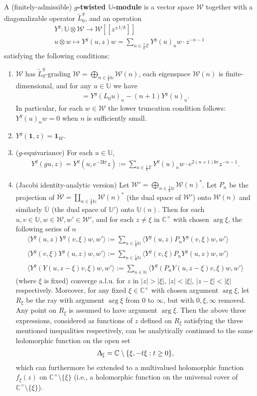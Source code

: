 \documentclass[12pt,a4paper,notitlepage]{article}
\theoremstyle{definition}
\theoremstyle{plain}
\newcommand{\mc}{\mathcal}
\newcommand{\wtd}{\widetilde}
\newcommand{\ovl}{\overline}
\newcommand{\id}{\mathbf{1}}
\newcommand{\bk}[1]{\langle {#1}\rangle}
\newcommand{\im}{\mathbf{i}}
\newcommand{\Ubb}{\mathbb U}
\newcommand{\Cbb}{\mathbb C}
\newcommand{\Nbb}{\mathbb N}
\newcommand{\Zbb}{\mathbb Z}
\numberwithin{equation}{section}
\begin{document}
A (finitely-admissible)  \textbf{$g$-twisted $\Ubb$-module} is a vector space $\mc W$ together with a diagonalizable operator $\wtd L_0^g$, and an operation
\begin{gather*}
Y^g:\Ubb\otimes\mc W\rightarrow	\mc W[[z^{\pm 1/k}]]\\
u\otimes w\mapsto Y^g(u,z)w=\sum_{n\in \frac 1k \Zbb}Y^g(u)_nw\cdot z^{-n-1}
\end{gather*}
satisfying the following conditions:
\begin{enumerate}
\item $\mc W$ has $\wtd L_0^g$-grading $\mc W=\bigoplus_{n\in\frac 1k\Nbb}\mc W(n)$, each eigenspace $\mc W(n)$ is finite-dimensional, and for any $u\in\Ubb$ we have
\begin{align}
[\wtd L_0^g,Y^g(u)_n]=Y^g(L_0u)_n-(n+1)Y^g(u)_n.\label{eq43}	
\end{align}
In particular, for each $w\in\mc W$ the lower truncation condition follows: $Y^g(u)_nw=0$ when $n$ is sufficiently small.
\item $Y^g(\id,z)=\id_{\mc W}$.
\item ($g$-equivariance) For each $u\in\Ubb$,
\begin{align}
Y^g(gu,z)=Y^g(u,e^{-2\im\pi}z):=\sum_{n\in \frac 1k \Zbb}Y^g(u)_nw\cdot e^{2(n+1)\im\pi}z^{-n-1}.\label{eq45}
\end{align}
\item (Jacobi identity-analytic version) Let $\mc W'=\bigoplus_{n\in\frac 1k\Nbb}\mc W(n)^*$. Let $P_n$ be the projection of $\ovl{\mc W}=\coprod_{n\in\frac 1k\Nbb}\mc W(n)^*$ (the dual space of $\mc W'$) onto $\mc W(n)$ and similarly $\ovl{\Ubb}$ (the dual space of $\Ubb'$) onto $\Ubb(n)$. Then for each $u,v\in\Ubb,w\in\mc W,w'\in\mc W'$, and for each $z\neq \xi$ in $\Cbb^\times$ with chosen $\arg \xi$, the following series of $n$
\begin{gather}
\bk{Y^g(u,z)Y^g(v,\xi)w,w'}:=\sum_{n\in\frac 1k\Nbb}	\bk{Y^g(u,z)P_nY^g(v,\xi)w,w'}\label{eq50}\\
\bk{Y^g(v,\xi)Y^g(u,z)w,w'}:=\sum_{n\in\frac 1k\Nbb}	\bk{Y^g(v,\xi)P_nY^g(u,z)w,w'}\label{eq51}\\
\bk{Y^g(Y(u,z-\xi)v,\xi)w,w'}:=\sum_{n\in\Nbb}	\bk{Y^g(P_nY(u,z-\xi)v,\xi)w,w'}\label{eq52}
\end{gather}
(where $\xi$ is fixed) converge a.l.u. for $z$ in $|z|>|\xi|$, $|z|<|\xi|$, $|z-\xi|<|\xi|$ respectively. Moreover, for any fixed $\xi\in\Cbb^\times$ with chosen argument $\arg \xi$, let $R_{\xi}$ be the ray with argument $\arg \xi$ from $0$ to $\infty$, but with $0,\xi,\infty$ removed. Any point on $R_{\xi}$ is assumed to have argument $\arg \xi$. Then the above three expressions, considered as functions of $z$ defined on $R_{\xi}$ satisfying the three mentioned inequalities respectively, can be analytically continued to the same holomorphic function on the open set
\begin{align*}
	\Updelta_\xi=\Cbb\setminus\{\xi,-t\xi:t\geq 0\},
\end{align*}
which can furthermore be extended to a multivalued holomorphic function $f_{\xi}(z)$ on $\Cbb^\times\setminus\{\xi\}$ (i.e., a holomorphic function on the universal cover of $\Cbb^\times\setminus\{\xi\}$).
\end{enumerate}
\end{document}
